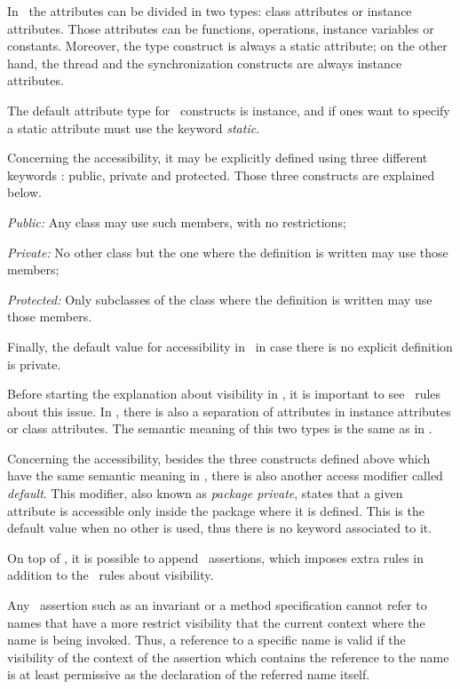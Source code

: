 In \vpp\ the attributes can be divided in two types: class attributes or instance attributes. 
Those attributes can be functions, operations, instance variables or constants. Moreover, the type construct is always a static attribute; on the other hand, the thread and the synchronization constructs are always instance attributes.

The default attribute type for \vpp\ constructs is instance, and if ones want to specify a static attribute must use the keyword \textit{static}.

Concerning the accessibility, it may be explicitly defined using three different keywords \cite{langmanpp}: public, private and protected. Those three constructs are explained below.

\begin{description}
\item{\textit{Public:}} Any class may use such members, with no restrictions; 
\item{\textit{Private:}} No other class but the one where the definition is written may use those members;
\item{\textit{Protected:}} Only subclasses of the class where the definition is written may use those members.
\end{description}
Finally, the default value for accessibility in \vpp\ in case there is no explicit definition is private.

Before starting the explanation about visibility in \jml, it is important to see \java\ rules about this issue. 
In \java, there is also a separation of attributes in instance attributes or class attributes. The semantic meaning of this two types is the same as in \vpp.

Concerning the accessibility, besides the three constructs defined above which have the same semantic meaning in \java, there is also another access modifier called \textit{default}. This modifier, also known as \textit{package private}, states that a given attribute is accessible only inside the package where it is defined. This is the default value when no other is used, thus there is no keyword associated to it.

On top of \java, it is possible to append \jml\ assertions, which imposes extra rules in addition to the \java\ rules about visibility.

Any \jml\ assertion such as an invariant or a method specification cannot refer to names that have a more restrict visibility that the current context where the name is being invoked. Thus, a reference to a specific name is valid if the visibility of the context of the assertion which contains the reference to the name is at least permissive as the declaration of the referred name itself.

